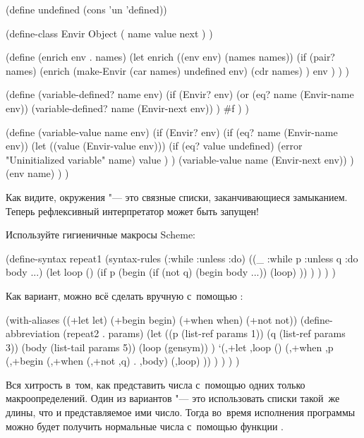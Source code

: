 \begin{code:lisp}
(define undefined (cons 'un 'defined))

(define-class Envir Object
  ( name value next ) )

(define (enrich env . names)
  (let enrich ((env env) (names names))
    (if (pair? names)
        (enrich (make-Envir (car names) undefined env)
                (cdr names) )
        env ) ) )

(define (variable-defined? name env)
  (if (Envir? env)
      (or (eq? name (Envir-name env))
          (variable-defined? name (Envir-next env)) )
      #f ) )

(define (variable-value name env)
  (if (Envir? env)
      (if (eq? name (Envir-name env))
          (let ((value (Envir-value env)))
            (if (eq? value undefined)
                (error "Uninitialized variable" name)
                value ) )
          (variable-value name (Envir-next env)) )
      (env name) ) )
\end{code:lisp}

Как видите, окружения "--- это связные списки, заканчивающиеся замыканием.
Теперь рефлексивный интерпретатор может быть запущен!




Используйте гигиеничные макросы Scheme:

\begin{code:lisp}
(define-syntax repeat1
  (syntax-rules (:while :unless :do)
    ((_ :while p :unless q :do body ...)
     (let loop ()
       (if p (begin (if (not q) (begin body ...))
                    (loop) )) ) ) ) )
\end{code:lisp}

\noindent
Как вариант, можно всё сделать вручную с~помощью :

\begin{code:lisp}
(with-aliases ((+let let) (+begin begin) (+when when) (+not not))
  (define-abbreviation (repeat2 . params)
    (let ((p    (list-ref  params 1))
          (q    (list-ref  params 3))
          (body (list-tail params 5))
          (loop (gensym)) )
      `(,+let ,loop ()
          (,+when ,p (,+begin (,+when (,+not ,q) . ,body)
                              (,loop) )) ) ) ) )
\end{code:lisp}



Вся хитрость в~том, как представить числа с~помощью одних только
макроопределений. Один из вариантов "--- это использовать списки такой~же длины,
что и представляемое ими число. Тогда во~время исполнения программы можно будет
получить нормальные числа с~помощью функции .

